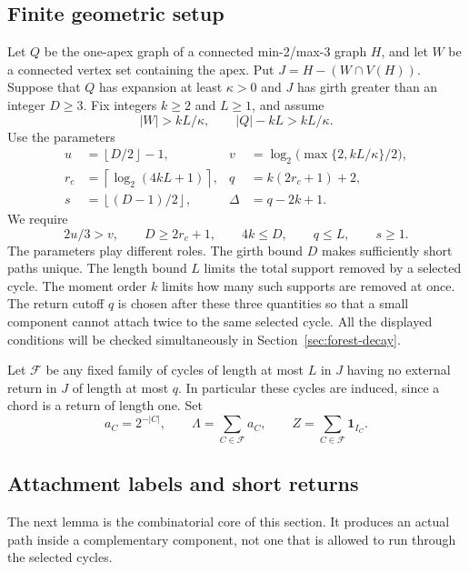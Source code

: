 \documentclass[11pt,a4paper]{article}
\numberwithin{equation}{section}
\theoremstyle{definition}
\theoremstyle{remark}
\newcommand{\ind}{\mathbf 1}
\newcommand{\ceil}[1]{\left\lceil#1\right\rceil}
\newcommand{\floor}[1]{\left\lfloor#1\right\rfloor}
\begin{document}
\subsection{Finite geometric setup}
Let $Q$ be the one-apex graph of a connected min-2/max-3 graph $H$, and let $W$ be a connected vertex set containing the apex. Put $J=H-(W\cap V(H))$. Suppose that $Q$ has expansion at least $\kappa>0$ and $J$ has girth greater than an integer $D\ge3$. Fix integers $k\ge2$ and $L\ge1$, and assume
\begin{equation}\label{eq:moment-anchors}
 |W|>kL/\kappa,\qquad |Q|-kL>kL/\kappa.
\end{equation}
Use the parameters
\begin{align}
 u&=\floor{D/2}-1,&
 v&=\log_2\bigl(\max\{2,kL/\kappa\}/2\bigr),\nonumber\\
 r_c&=\ceil{\log_2(4kL+1)},&
 q&=k(2r_c+1)+2,\label{eq:moment-geometry}\\
 s&=\floor{(D-1)/2},&
 \Delta&=q-2k+1.\nonumber
\end{align}
We require
\begin{equation}\label{eq:moment-conditions}
 2u/3>v,\qquad D\ge2r_c+1,\qquad4k\le D,\qquad q\le L,\qquad s\ge1.
\end{equation}
The parameters play different roles. The girth bound $D$ makes sufficiently short paths unique. The length bound $L$ limits the total support removed by a selected cycle. The moment order $k$ limits how many such supports are removed at once. The return cutoff $q$ is chosen after these three quantities so that a small component cannot attach twice to the same selected cycle. All the displayed conditions will be checked simultaneously in Section~\ref{sec:forest-decay}.

Let $\mathcal F$ be any fixed family of cycles of length at most $L$ in $J$ having no external return in $J$ of length at most $q$. In particular these cycles are induced, since a chord is a return of length one. Set
\[
 a_C=2^{-|C|},\qquad \Lambda=\sum_{C\in\mathcal F}a_C,
 \qquad Z=\sum_{C\in\mathcal F}\ind_{I_C}.
\]

\subsection{Attachment labels and short returns}
The next lemma is the combinatorial core of this section. It produces an actual path inside a complementary component, not one that is allowed to run through the selected cycles.
\end{document}
